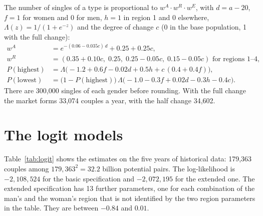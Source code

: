 \documentclass[12pt,a4paper]{article}
\begin{document}
The number of singles of a type is proportional to $w^A \cdot w^R \cdot w^E$, with $d = a - 20$,
$f = 1$ for women and 0 for men, $h = 1$ in region 1 and 0 elsewhere, $\Lambda(z) = 1/(1+e^{-z})$
and the degree of change $c$ (0 in the base population, 1 with the full change):
\begin{align*}
w^A &= e^{-(0.06 - 0.035c)\,d} + 0.25 + 0.25c, \\
w^R &= (0.35 + 0.10c,\; 0.25,\; 0.25 - 0.05c,\; 0.15 - 0.05c) \text{ for regions 1--4}, \\
P(\text{highest}) &= \Lambda\bigl(-1.2 + 0.6f - 0.02d + 0.5h + c\,(0.4 + 0.4f)\bigr), \\
P(\text{lowest}) &= \bigl(1 - P(\text{highest})\bigr)\,\Lambda\bigl(-1.0 - 0.3f + 0.02d - 0.3h - 0.4c\bigr).
\end{align*}
There are 300,000 singles of each gender before rounding. With the full change the market forms
33,074 couples a year, with the half change 34,602.

\section{The logit models}\label{app:logit}

Table~\ref{tab:logit} shows the estimates on the five years of historical data: 179,363 couples
among $179{,}363^2 = 32.2$ billion potential pairs. The log-likelihood is $-2{,}108{,}524$ for
the basic specification and $-2{,}072{,}195$ for the extended one. The extended specification
has 13 further parameters, one for each combination of the man's and the woman's region that is
not identified by the two region parameters in the table. They are between $-0.84$ and $0.01$.
\end{document}
